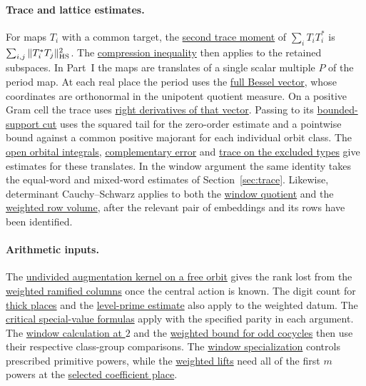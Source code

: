 \documentclass[11pt,a4paper]{article}
\begin{document}
\paragraph{Trace and lattice estimates.}
For maps \(T_i\) with a common target, the
\hyperlink{proof.full-trace-identity}{second trace moment} of
\(\sum_i T_iT_i^*\) is \(\sum_{i,j}\|T_i^*T_j\|_{\rm HS}^2\).
The \hyperlink{proof.cut-frame-energy}{compression inequality}
then applies to the retained subspaces. In Part~I the maps are
translates of a single scalar multiple \(P\) of the period map.
At each real place the period uses the
\hyperlink{proof.weighted-real-bessel-vectors}{full Bessel vector},
whose coordinates are orthonormal in the unipotent quotient measure.
On a positive Gram cell the trace uses
\hyperlink{proof.weighted-bessel-smooth-words}{right derivatives of that vector}.
Passing to its \hyperlink{proof.weighted-bessel-tail-truncation}{bounded-support cut}
uses the squared tail for the zero-order estimate and a pointwise
bound against a common positive majorant for each individual orbit class.
The \hyperlink{proof.weighted-open-packets}{open orbital integrals},
\hyperlink{proof.weighted-complement-crude}{complementary error} and
\hyperlink{proof.weighted-induced-bad-trace}{trace on the excluded types}
give estimates for these translates. In the window argument the same
identity takes the equal-word and mixed-word estimates of
Section~\ref{sec:trace}. Likewise, determinant Cauchy--Schwarz applies
to both the \hyperlink{proof.fitted-row-mixed-gram}{window quotient}
and the \hyperlink{proof.weighted-volume}{weighted row volume}, after
the relevant pair of embeddings and its rows have been identified.

\paragraph{Arithmetic inputs.}
The \hyperlink{proof.diamond-augmentation-kernels}{undivided augmentation
kernel on a free orbit} gives the rank lost from the
\hyperlink{proof.weighted-central-orbits}{weighted ramified columns}
once the central action is known. The digit count for
\hyperlink{proof.weighted-thick-places}{thick places} and the
\hyperlink{proof.weighted-level-primes}{level-prime estimate} also
apply to the weighted datum. The
\hyperlink{proof.shared-critical-selmer-values}{critical special-value
formulas} apply with the specified parity in each argument. The
\hyperlink{proof.selmer-classical-all-layers}{window calculation at \(2\)}
and the \hyperlink{proof.weighted-fit-odd-class-budget}{weighted bound
for odd cocycles} then use their respective class-group comparisons.
The \hyperlink{proof.common-twist-specialization}{window
specialization} controls prescribed primitive powers, while the
\hyperlink{proof.weighted-torsion-specialization}{weighted lifts}
need all of the first \(m\) powers at the
\hyperlink{proof.weighted-selected-coefficient}{selected coefficient place}.
\end{document}
